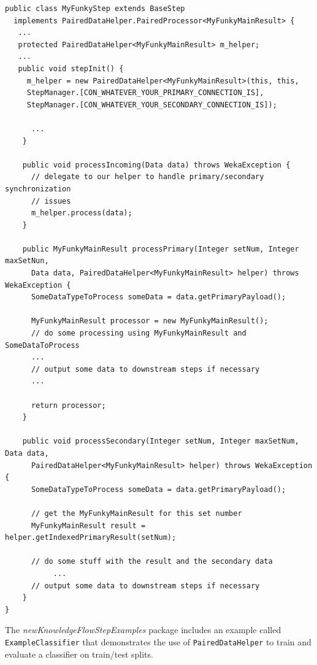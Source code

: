 \begin{verbatim}
public class MyFunkyStep extends BaseStep
  implements PairedDataHelper.PairedProcessor<MyFunkyMainResult> {
   ...
   protected PairedDataHelper<MyFunkyMainResult> m_helper;
   ...
   public void stepInit() {
     m_helper = new PairedDataHelper<MyFunkyMainResult>(this, this,
     StepManager.[CON_WHATEVER_YOUR_PRIMARY_CONNECTION_IS],
     StepManager.[CON_WHATEVER_YOUR_SECONDARY_CONNECTION_IS]);

      ...
    }

    public void processIncoming(Data data) throws WekaException {
      // delegate to our helper to handle primary/secondary synchronization
      // issues
      m_helper.process(data);
    }

    public MyFunkyMainResult processPrimary(Integer setNum, Integer maxSetNun,
      Data data, PairedDataHelper<MyFunkyMainResult> helper) throws WekaException {
      SomeDataTypeToProcess someData = data.getPrimaryPayload();
 
      MyFunkyMainResult processor = new MyFunkyMainResult();
      // do some processing using MyFunkyMainResult and SomeDataToProcess
      ...
      // output some data to downstream steps if necessary
      ...
   
      return processor;
    }
   
    public void processSecondary(Integer setNum, Integer maxSetNum, Data data,
      PairedDataHelper<MyFunkyMainResult> helper) throws WekaException {
      SomeDataTypeToProcess someData = data.getPrimaryPayload();
   
      // get the MyFunkyMainResult for this set number
      MyFunkyMainResult result = helper.getIndexedPrimaryResult(setNum);
   
      // do some stuff with the result and the secondary data
           ...
      // output some data to downstream steps if necessary
    }
}

\end{verbatim}

The \textit{newKnowledgeFlowStepExamples} package includes an example
called \verb=ExampleClassifier= that demonstrates the use of
\verb=PairedDataHelper= to train and evaluate a classifier on
train/test splits.
